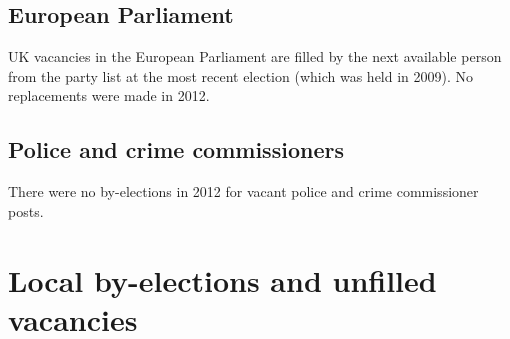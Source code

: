 \documentclass[a4paper,openany]{book}
\begin{document}
\section{European Parliament}

UK vacancies in the European Parliament are filled by the next available person from the party list at the most recent election (which was held in 2009). 
No replacements were made in 2012.

\section{Police and crime commissioners}

There were no by-elections in 2012 for vacant police and crime commissioner posts.

\chapter{Local by-elections and unfilled vacancies}
\end{document}
